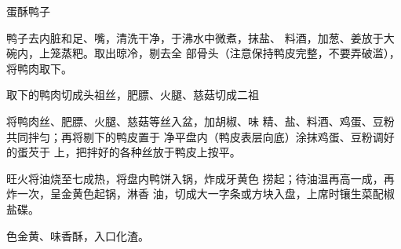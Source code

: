 \begin{recipe}{蛋酥鸭子}

\ingredients


\cooking

\step 鸭子去内脏和足、嘴，清洗干净，于沸水中微煮，抹盐、 料酒，加葱、姜放于大碗内，上笼蒸粑。取出晾冷，剔去全 部骨头（注意保持鸭皮完整，不要弄破滥），将鸭肉取下。

\step 取下的鸭肉切成头祖丝，肥膘、火腿、慈菇切成二祖

将鸭肉丝、肥膘、火腿、慈菇等丝入盆，加胡椒、味 精、盐、料酒、鸡蛋、豆粉共同拌匀；再将剔下的鸭皮置于 净平盘内（鸭皮表层向底）涂抹鸡蛋、豆粉调好的蛋芡于 上，把拌好的各种丝放于鸭皮上按平。

\step 旺火将油烧至七成热，将盘内鸭饼入锅，炸成牙黄色 捞起；待油温再高一成，再炸一次，呈金黄色起锅，淋香 油，切成大一字条或方块入盘，上席时镶生菜配椒盐碟。

\notes

色金黄、味香酥，入口化渣。

\end{recipe}

